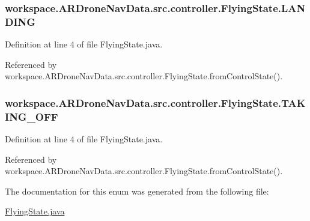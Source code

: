 \subsubsection[{L\+A\+N\+D\+I\+N\+G}]{\setlength{\rightskip}{0pt plus 5cm}workspace.\+A\+R\+Drone\+Nav\+Data.\+src.\+controller.\+Flying\+State.\+L\+A\+N\+D\+I\+N\+G}\label{enumworkspace_1_1_a_r_drone_nav_data_1_1src_1_1controller_1_1_flying_state_ad17ba4a18698cd841657165c7252c2aa}


Definition at line 4 of file Flying\+State.\+java.



Referenced by workspace.\+A\+R\+Drone\+Nav\+Data.\+src.\+controller.\+Flying\+State.\+from\+Control\+State().

\hypertarget{enumworkspace_1_1_a_r_drone_nav_data_1_1src_1_1controller_1_1_flying_state_aab59e058b45f5a8dbd0182e43781a159}{}
\subsubsection[{T\+A\+K\+I\+N\+G\+\_\+\+O\+F\+F}]{\setlength{\rightskip}{0pt plus 5cm}workspace.\+A\+R\+Drone\+Nav\+Data.\+src.\+controller.\+Flying\+State.\+T\+A\+K\+I\+N\+G\+\_\+\+O\+F\+F}\label{enumworkspace_1_1_a_r_drone_nav_data_1_1src_1_1controller_1_1_flying_state_aab59e058b45f5a8dbd0182e43781a159}


Definition at line 4 of file Flying\+State.\+java.



Referenced by workspace.\+A\+R\+Drone\+Nav\+Data.\+src.\+controller.\+Flying\+State.\+from\+Control\+State().



The documentation for this enum was generated from the following file\+:\begin{DoxyCompactItemize}
\item 
\hyperlink{_flying_state_8java}{Flying\+State.\+java}\end{DoxyCompactItemize}
